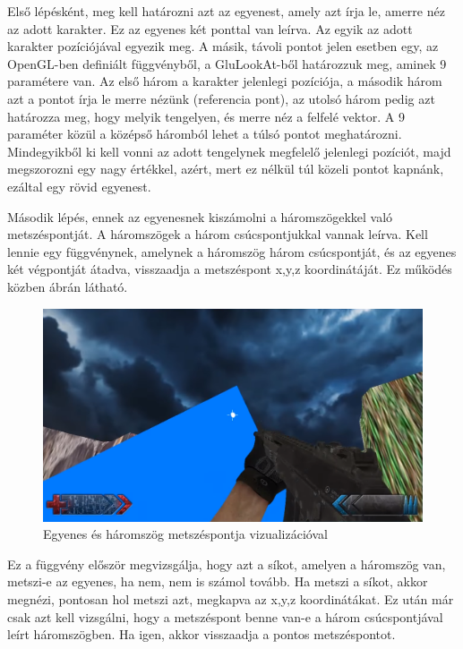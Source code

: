 Első lépésként, meg kell határozni azt az egyenest, amely azt írja le, amerre néz az adott karakter. Ez az egyenes két ponttal van leírva. Az egyik az adott karakter pozíciójával egyezik meg. A másik, távoli pontot jelen esetben egy, az OpenGL-ben definiált függvényből, a GluLookAt-ből határozzuk meg, aminek 9 paramétere van. Az első három a karakter jelenlegi pozíciója, a második három azt a pontot írja le merre nézünk (referencia pont), az utolsó három pedig azt határozza meg, hogy melyik tengelyen, és merre néz a felfelé vektor. A 9 paraméter közül a középső háromból lehet a túlsó pontot  meghatározni. Mindegyikből ki kell vonni az adott tengelynek megfelelő jelenlegi pozíciót, majd megszorozni egy nagy értékkel, azért, mert ez nélkül túl közeli pontot kapnánk, ezáltal egy rövid egyenest.

Második lépés, ennek az egyenesnek kiszámolni a háromszögekkel való metszéspontját. A háromszögek a három csúcspontjukkal vannak leírva. Kell lennie egy függvénynek, amelynek a háromszög három csúcspontját, és az egyenes két végpontját átadva, visszaadja a metszéspont x,y,z koordinátáját. Ez működés közben  ábrán látható.

\begin{figure}[h]
\centering
\includegraphics[scale=0.4]{kepek/one_triangle.png}
\caption{Egyenes és háromszög metszéspontja vizualizációval}
\label{fig:triangle}
\end{figure}

Ez a függvény először megvizsgálja, hogy azt a síkot, amelyen a háromszög van, metszi-e az egyenes, ha nem, nem is számol tovább. Ha metszi a síkot, akkor megnézi, pontosan hol metszi azt, megkapva az x,y,z koordinátákat. Ez után már csak azt kell vizsgálni, hogy a metszéspont benne van-e a három csúcspontjával leírt háromszögben. Ha igen, akkor visszaadja a pontos metszéspontot.

